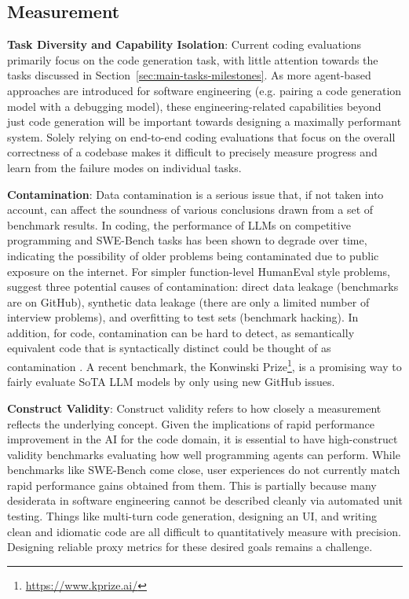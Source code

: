 \subsection{Measurement}

\textbf{Task Diversity and Capability Isolation}: 
Current coding evaluations primarily focus on the code generation task, with little attention towards the tasks discussed in Section~\ref{sec:main-tasks-milestones}.
As more agent-based approaches are introduced for software engineering (e.g. pairing a code generation model with a debugging model), these engineering-related capabilities beyond just code generation will be important towards designing a maximally performant system. 
Solely relying on end-to-end coding evaluations that focus on the overall correctness of a codebase makes it difficult to precisely measure progress and learn from the failure modes on individual tasks.


\textbf{Contamination}: 
Data contamination is a serious issue that, if not taken into account, can affect the soundness of various conclusions drawn from a set of benchmark results. In coding, the performance of LLMs on competitive programming \citep{xu2024benchmark, jain2024livecodebenchholisticcontaminationfree} and SWE-Bench \citep{aleithan2024swe} tasks has been shown to degrade over time, indicating the possibility of older problems being contaminated due to public exposure on the internet. For simpler function-level HumanEval style problems, \citet{matton2024leakage} suggest three potential causes of contamination: direct data leakage (benchmarks are on GitHub), synthetic data leakage (there are only a limited number of interview problems), and overfitting to test sets (benchmark hacking). In addition, for code, contamination can be hard to detect, as semantically equivalent code that is syntactically distinct could be thought of as contamination \citep{riddell2024quantifying}. A recent benchmark, the Konwinski Prize\footnote{\url{https://www.kprize.ai/}}, is a promising way to fairly evaluate SoTA LLM models by only using new GitHub issues.

\textbf{Construct Validity}:
Construct validity refers to how closely a measurement reflects the underlying concept. 
Given the implications of rapid performance improvement in the AI for the code domain, it is essential to have high-construct validity benchmarks evaluating how well programming agents can perform.
While benchmarks like SWE-Bench come close, user experiences do not currently match rapid performance gains obtained from them. 
This is partially because many desiderata in software engineering cannot be described cleanly via automated unit testing. Things like multi-turn code generation, designing an UI, and writing clean and idiomatic code are all difficult to quantitatively measure with precision. Designing reliable proxy metrics for these desired goals remains a challenge. 

